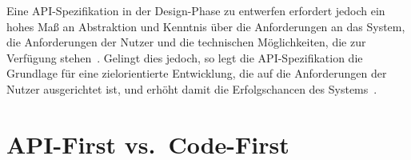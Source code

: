 Eine \ac{API}-Spezifikation in der Design-Phase zu entwerfen erfordert jedoch ein hohes Maß an Abstraktion und Kenntnis über die Anforderungen an das System, die Anforderungen der Nutzer und die technischen Möglichkeiten, die zur Verfügung stehen~\autocite[362]{de23}. Gelingt dies jedoch, so legt die \ac{API}-Spezifikation die Grundlage für eine zielorientierte Entwicklung, die auf die Anforderungen der Nutzer ausgerichtet ist, und erhöht damit die Erfolgschancen des Systems~\autocite[1627]{cha21}.

\section{API-First vs.\ Code-First}